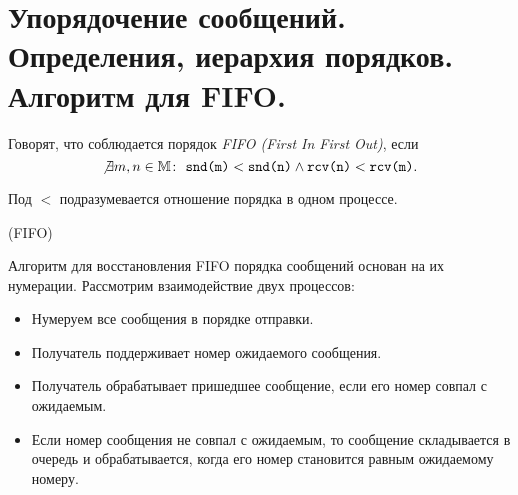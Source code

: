 \section{Упорядочение сообщений. Определения, иерархия порядков. Алгоритм для FIFO.}

\begin{definition}
    Говорят, что соблюдается порядок \textit{FIFO (First In First Out)}, если
    \[
        \not \exists m,n \in \mathbb{M} \colon~ \texttt{snd(m)} < \texttt{snd(n)}
        \wedge \texttt{rcv(n)} < \texttt{rcv(m)}
    .\]
\end{definition}

\begin{remark}
    Под $<$ подразумевается отношение порядка в одном процессе.
\end{remark}

\begin{algorithm}(FIFO)

    Алгоритм для восстановления FIFO порядка сообщений основан на их нумерации. Рассмотрим взаимодействие двух процессов:
    \begin{itemize}
        \item Нумеруем все сообщения в порядке отправки.
        \item Получатель поддерживает номер ожидаемого сообщения.
        \item Получатель обрабатывает пришедшее сообщение, если его номер совпал с ожидаемым.
        \item Если номер сообщения не совпал с ожидаемым, то сообщение 
            складывается в очередь и обрабатывается, когда его номер становится 
            равным ожидаемому номеру.
    \end{itemize}
\end{algorithm}
